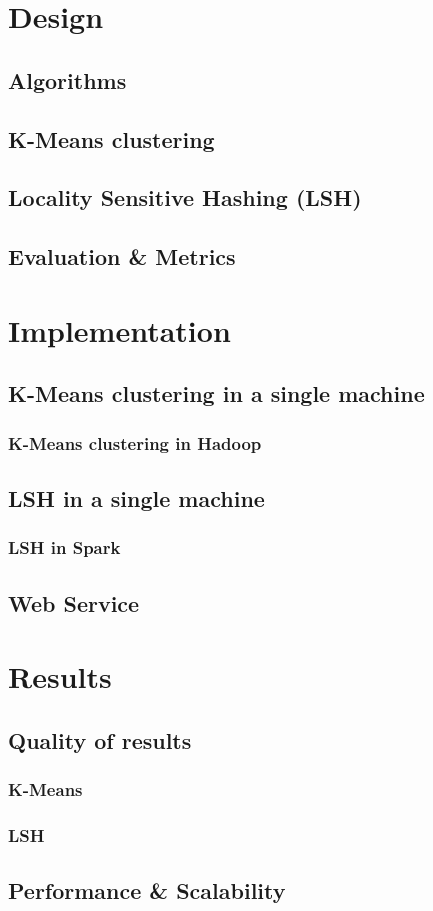 \documentclass[11pt,a4paper,twoside]{scrartcl}
\begin{document}
  \section{Design}
    \subsection{Algorithms}
      \subsection{K-Means clustering}
      \subsection{Locality Sensitive Hashing (LSH)}
    \subsection{Evaluation \& Metrics}
  \section{Implementation}
    \subsection{K-Means clustering in a single machine}
      \subsubsection{K-Means clustering in Hadoop}
    \subsection{LSH in a single machine}
      \subsubsection{LSH in Spark}
    \subsection{Web Service}
  \section{Results}
    \subsection{Quality of results}
      \subsubsection{K-Means}
      \subsubsection{LSH}
    \subsection{Performance \& Scalability}
  
\end{document}
